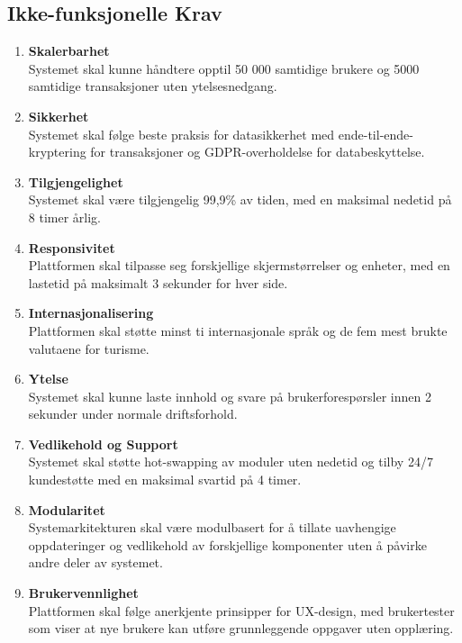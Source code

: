 \documentclass[../doc.tex]{subfiles}
\begin{document}
\subsection{Ikke-funksjonelle Krav}
\begin{enumerate}
    \item \textbf{Skalerbarhet} \\
    Systemet skal kunne håndtere opptil 50 000 samtidige brukere og 5000 samtidige transaksjoner uten ytelsesnedgang.

    \item \textbf{Sikkerhet} \\
    Systemet skal følge beste praksis for datasikkerhet med ende-til-ende-kryptering for transaksjoner og GDPR-overholdelse for databeskyttelse.

    \item \textbf{Tilgjengelighet} \\ 
    Systemet skal være tilgjengelig 99,9\% av tiden, med en maksimal nedetid på 8 timer årlig.

    \item \textbf{Responsivitet} \\
    Plattformen skal tilpasse seg forskjellige skjermstørrelser og enheter, med en lastetid på maksimalt 3 sekunder for hver side.

    \item \textbf{Internasjonalisering} \\
    Plattformen skal støtte minst ti internasjonale språk og de fem mest brukte valutaene for turisme.

    \item \textbf{Ytelse} \\
    Systemet skal kunne laste innhold og svare på brukerforespørsler innen 2 sekunder under normale driftsforhold.

    \item \textbf{Vedlikehold og Support} \\
    Systemet skal støtte hot-swapping av moduler uten nedetid og tilby 24/7 kundestøtte med en maksimal svartid på 4 timer.

    \item \textbf{Modularitet} \\
    Systemarkitekturen skal være modulbasert for å tillate uavhengige oppdateringer og vedlikehold av forskjellige komponenter uten å påvirke andre deler av systemet.

    \item \textbf{Brukervennlighet} \\
    Plattformen skal følge anerkjente prinsipper for UX-design, med brukertester som viser at nye brukere kan utføre grunnleggende oppgaver uten opplæring.


\end{enumerate}
\end{document}
